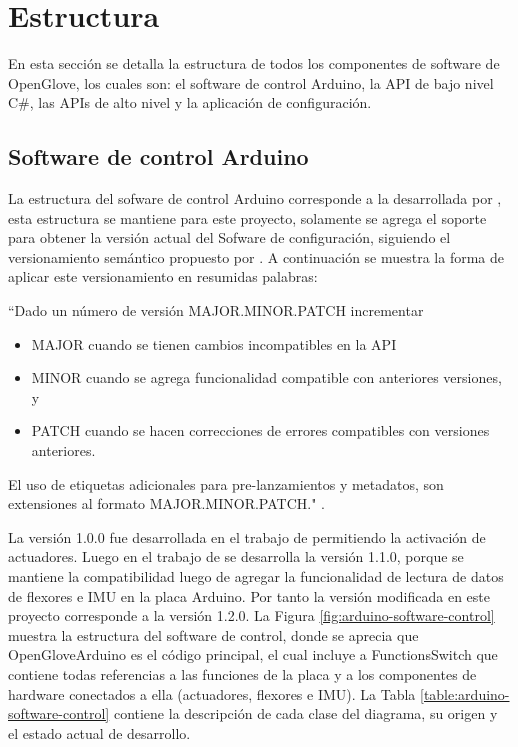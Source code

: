 \section{Estructura}
En esta sección se detalla la estructura de todos los componentes de software de OpenGlove, los cuales son: el software de control Arduino, la API de bajo nivel C\#, las APIs de alto nivel  y la aplicación de configuración.





\subsection{Software de control Arduino}
La estructura del sofware de control Arduino corresponde a la desarrollada por \cite{tesis-cerda-rodrigo}, esta estructura se mantiene para este proyecto, solamente se agrega el soporte para obtener la versión actual del Sofware de configuración, siguiendo el versionamiento semántico propuesto por \cite{semantic-versioning-tom-preston-werner-coFounder-GitHub}. A continuación se muestra la forma de aplicar este versionamiento en resumidas palabras:

``Dado un número de versión MAJOR.MINOR.PATCH incrementar
\begin{itemize}
\item MAJOR cuando se tienen cambios incompatibles en la API
\item MINOR cuando se agrega funcionalidad compatible con anteriores versiones, y
\item PATCH cuando se hacen correcciones de errores compatibles con versiones anteriores.
\end{itemize}
El uso de etiquetas adicionales para pre-lanzamientos y metadatos, son extensiones al formato MAJOR.MINOR.PATCH." \citep{semantic-versioning-tom-preston-werner-coFounder-GitHub}. 

La versión 1.0.0 fue desarrollada en el trabajo de \cite{tesis-monsalve-rodrigo} permitiendo la activación de actuadores. Luego en el trabajo de \cite{tesis-cerda-rodrigo} se desarrolla la versión 1.1.0, porque se mantiene la compatibilidad luego de agregar la funcionalidad de lectura de datos de flexores e IMU en la placa Arduino. Por tanto la versión modificada en este proyecto corresponde a la versión 1.2.0. La Figura \ref{fig:arduino-software-control} muestra la estructura del software de control, donde se aprecia que OpenGloveArduino es el código principal, el cual incluye a FunctionsSwitch que contiene todas referencias a las funciones de la placa y a los componentes de hardware conectados a ella (actuadores, flexores e IMU).  La Tabla \ref{table:arduino-software-control} contiene la descripción de cada clase del diagrama, su origen y el estado actual de desarrollo.

